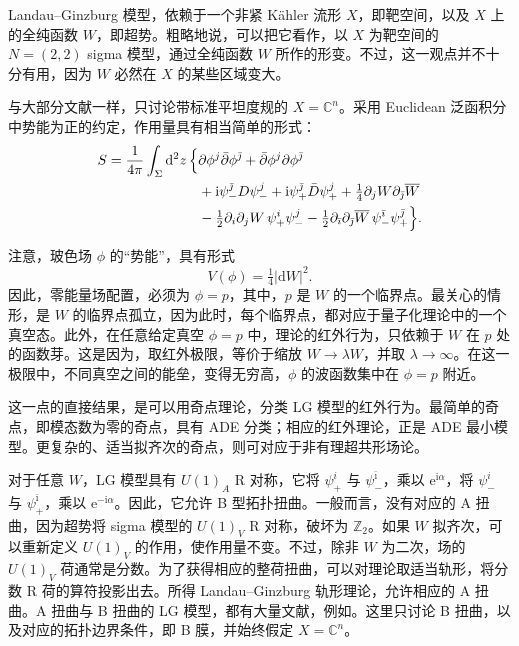 Landau--Ginzburg 模型，依赖于一个非紧 K\"ahler 流形 $X$，即靶空间，以及 $X$ 上的全纯函数 $W$，即超势。粗略地说，可以把它看作，以 $X$ 为靶空间的 $N=(2,2)$ sigma 模型，通过全纯函数 $W$ 所作的形变。不过，这一观点并不十分有用，因为 $W$ 必然在 $X$ 的某些区域变大。

与大部分文献一样，只讨论带标准平坦度规的 $X=\mathbb{C}^n$。采用 Euclidean 泛函积分中势能为正的约定，作用量具有相当简单的形式：
\begin{equation}\label{eq:3.199}
\begin{aligned}
S=\frac1{4\pi}\int_\Sigma\mathrm{d}^2z\,\Bigl\{&
\partial\phi^j\bar\partial\phi^{\bar\jmath}
+\bar\partial\phi^j\partial\phi^{\bar\jmath}\\
&+\mathrm{i}\psi_-^{\bar\jmath}D\psi_-^j
+\mathrm{i}\psi_+^{\bar\jmath}\bar D\psi_+^j
+\tfrac14\partial_jW\partial_{\bar\jmath}\overline W\\
&-\tfrac12\partial_i\partial_jW\,\psi_+^i\psi_-^j
-\tfrac12\partial_{\bar\imath}\partial_{\bar\jmath}\overline W\,
\psi_-^{\bar\imath}\psi_+^{\bar\jmath}\Bigr\}.
\end{aligned}
\end{equation}

注意，玻色场 $\phi$ 的“势能”，具有形式
\[
V(\phi)=\tfrac14|\mathrm{d}W|^2.
\]
因此，零能量场配置，必须为 $\phi=p$，其中，$p$ 是 $W$ 的一个临界点。最关心的情形，是 $W$ 的临界点孤立，因为此时，每个临界点，都对应于量子化理论中的一个真空态。此外，在任意给定真空 $\phi=p$ 中，理论的红外行为，只依赖于 $W$ 在 $p$ 处的函数芽。这是因为，取红外极限，等价于缩放 $W\to\lambda W$，并取 $\lambda\to\infty$。在这一极限中，不同真空之间的能垒，变得无穷高，$\phi$ 的波函数集中在 $\phi=p$ 附近。

这一点的直接结果，是可以用奇点理论，分类 LG 模型的红外行为。最简单的奇点，即模态数为零的奇点，具有 ADE 分类；相应的红外理论，正是 ADE 最小模型。更复杂的、适当拟齐次的奇点，则可对应于非有理超共形场论。

对于任意 $W$，LG 模型具有 $U(1)_A$ R 对称，它将 $\psi_+^i$ 与 $\psi_-^{\bar\imath}$，乘以 $\mathrm{e}^{\mathrm{i}\alpha}$，将 $\psi_-^i$ 与 $\psi_+^{\bar\imath}$，乘以 $\mathrm{e}^{-\mathrm{i}\alpha}$。因此，它允许 B 型拓扑扭曲。一般而言，没有对应的 A 扭曲，因为超势将 sigma 模型的 $U(1)_V$ R 对称，破坏为 $\mathbb{Z}_2$。如果 $W$ 拟齐次，可以重新定义 $U(1)_V$ 的作用，使作用量不变。不过，除非 $W$ 为二次，场的 $U(1)_V$ 荷通常是分数。为了获得相应的整荷扭曲，可以对理论取适当轨形，将分数 R 荷的算符投影出去。所得 Landau--Ginzburg 轨形理论，允许相应的 A 扭曲。A 扭曲与 B 扭曲的 LG 模型，都有大量文献，例如。这里只讨论 B 扭曲，以及对应的拓扑边界条件，即 B 膜，并始终假定 $X=\mathbb{C}^n$。

